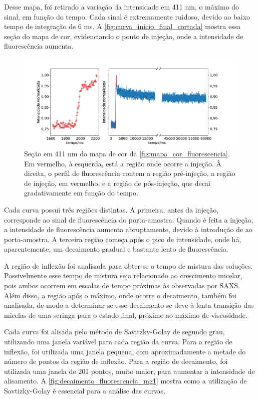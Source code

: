 	Desse mapa, foi retirado a variação da intensidade em 411 nm, o máximo do sinal, em função do tempo. Cada sinal é extremamente ruidoso, devido ao baixo tempo de integração de 6 ms.
	A \autoref{fig:curva_inicio_final_cortada} mostra essa seção do mapa de cor, evidenciando o ponto de injeção, onde a intensidade de fluorescência aumenta.
	
	\begin{figure}[h]
		\centering
		\includegraphics[width=\textwidth]{imagens/fluor/curva_inicio_final_cortada}
		\caption{Seção em 411 nm do mapa de cor da  \autoref{fig:mapa_cor_fluorescencia}. Em vermelho, à esquerda, está a região onde ocorre a injeção. À direita, o perfil de fluorescência contem a região pré-injeção, a região de injeção, em vermelho, e a região de pós-injeção, que decai gradativamente em função do tempo.}
		\label{fig:curva_inicio_final_cortada} 
	\end{figure}
	
	Cada curva possui três regiões distintas. A primeira, antes da injeção, corresponde ao sinal de fluorescência do porta-amostra. Quando é feita a injeção, a intensidade de fluorescência aumenta abruptamente, devido à introdução de \TTAB{} ao porta-amostra. A terceira região começa após o pico de intensidade, onde há, aparentemente, um decaimento gradual e bastante lento de fluorescência.
	
	A região de inflexão foi analisada para obter-se o tempo de mistura das soluções. Possivelmente esse tempo de mistura seja relacionado ao crescimento micelar, pois ambos ocorrem em escalas de tempo próximas às observadas por SAXS. Além disso, a região após o máximo, onde ocorre o decaimento, também foi analisada, de modo a determinar se esse decaimento se deve à lenta transição das micelas de uma seringa para o estado final, próximo ao máximo de viscosidade. 
	
	Cada curva foi alisada pelo método de Savitzky-Golay de segundo grau, utilizando uma janela variável para cada região da curva. Para a região de inflexão, foi utilizada uma janela pequena, com aproximadamente a metade do número de pontos da região de inflexão. Para a região de decaimento, foi utilizada uma janela de 201 pontos, muito maior, para aumentar a intensidade de alisamento. A \autoref{fig:decaimento_fluorescencia_mg1} mostra como a utilização de Savtizky-Golay é essencial para a análise das curvas. 

